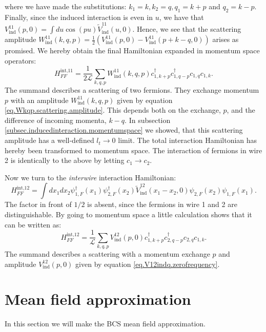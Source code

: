where we have made the substitutions: $k_1 = k, k_2 = q, q_1 = k + p$ and $q_2 = k - p$. Finally, since the induced interaction is even in $u$, we have that $V^{11}_{\text{ind}}(p, 0) = \int du \cos(pu) \tilde{V}^{11}_{\text{ind}}(u, 0)$. Hence, we see that the scattering amplitude $W^{11}_{\text{ind}}(k, q, p) = \frac{1}{2}\left(V^{11}_\text{ind}\left( p, 0 \right) - V^{11}_\text{ind}\left( p + k - q, 0 \right) \right)$ arises as promised. We hereby obtain the final Hamiltonian expanded in momentum space operators:
\begin{equation}
H^\text{int,11}_{FF} = \frac{1}{2\mathcal{L}} \sum_{k,q,p} W^{11}_{\text{ind}}(k, q, p) c^\dagger_{1, k + p} c^\dagger_{1, q - p} c_{1, q} c_{1, k}. 
\label{eq.H11intMomentumSpace}
\end{equation}
The summand describes a scattering of two fermions. They exchange momentum $p$ with an amplitude $W^{11}_{\text{ind}}(k, q, p)$ given by equation \eqref{eq.Wkqp.scattering.amplitude}. This depends both on the exchange, $p$, and the difference of incoming momenta, $k - q$. In subsection \ref{subsec.inducedinteraction.momentumspace} we showed, that this scattering amplitude has a well-defined $l_t \to 0$ limit. The total interaction Hamiltonian has hereby been transformed to momentum space. The interaction of fermions in wire 2 is identically to the above by letting $c_1 \to c_2$.  

Now we turn to the \textit{interwire} interaction Hamiltonian:
\begin{equation}
H^\text{int,12}_{FF} = \int dx_1 dx_2 \psi^\dagger_{1,F}(x_1)\psi^\dagger_{2,F}(x_2) \tilde{V}_{\text{ind}}^{12}(x_1 - x_2,0) \psi_{2,F}(x_2)\psi_{1,F}(x_1).
\label{eq.Hint12realspace}
\end{equation}
The factor in front of $1/2$ is absent, since the fermions in wire 1 and 2 are distinguishable. By going to momentum space a little calculation shows that it can be written as:
\begin{equation}
H^\text{int,12}_{FF} = \frac{1}{\mathcal{L}}\sum_{k,q,p} V_{\text{ind}}^{12}(p, 0) c^\dagger_{1,k + p} c^\dagger_{2, q - p} c_{2, q} c_{1, k}. 
\label{eq.Hint12momentumspace}
\end{equation}
The summand describes a scattering with a momentum exchange $p$ and amplitude $V_{\text{ind}}^{12}(p,0)$ given by equation \eqref{eq.V12indq.zerofrequency}. 

\section{Mean field approximation} \label{sec.meanfieldapproximation}
In this section we will make the BCS mean field approximation. 

